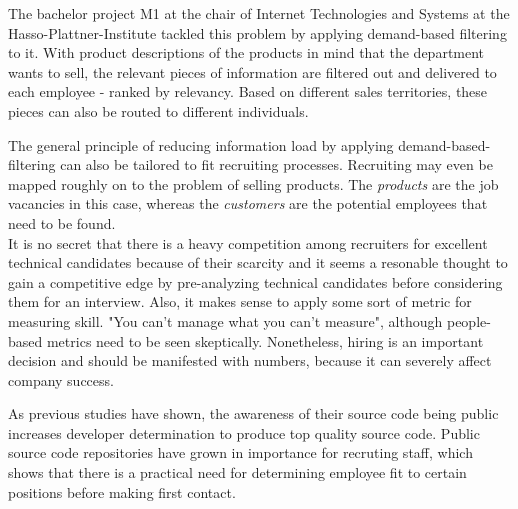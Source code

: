 The bachelor project M1 at the chair of Internet Technologies and Systems
at the Hasso-Plattner-Institute tackled this problem by applying demand-based filtering to it.
With product descriptions of the products in mind that the department wants to sell,
the relevant pieces of information are filtered out and delivered to each employee -
ranked by relevancy. Based on different sales territories,
these pieces can also be routed to different individuals.
\newline


The general principle of reducing information load by applying
demand-based-filtering can also be tailored to fit recruiting processes.
Recruiting may even be mapped roughly on to the problem of selling products.
The \textit{products} are the job vacancies in this case, whereas the
\textit{customers} are the potential employees that need to be found.\\
It is no secret that there is a heavy competition among recruiters for excellent
technical candidates because of their scarcity and it seems a resonable thought
to gain a competitive edge by pre-analyzing technical candidates
before considering them for an interview. Also, it makes sense to apply
some sort of metric for measuring skill.
"You can't manage what you can't measure"\cite{tdm:1986}, although people-based metrics
need to be seen skeptically. Nonetheless, hiring is an important decision and
should be manifested with numbers, because it can severely affect
company success\cite{hk:1998}.
\newline

As previous studies have shown, the awareness of their source
code being public increases developer determination
to produce top quality source code\cite{md:2013}.
Public source code repositories have grown in importance for recruting
staff, which shows that there is a practical need for determining
employee fit to certain positions before making first contact.

